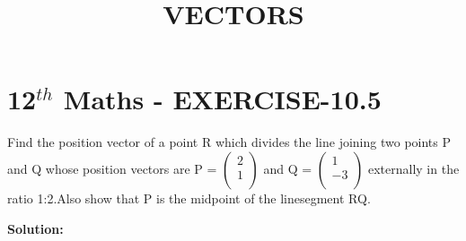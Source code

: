\documentclass[10pt]{article}
\newcommand{\solution}{\noindent \textbf{Solution: }}
\newcommand{\myvec}[1]{\ensuremath{\begin{pmatrix}#1\end{pmatrix}}}
\begin{document}
\begin{center}
\title{\textbf{VECTORS}}
\date{\vspace{-5ex}} %
\maketitle
\end{center}

\section*{12$^{th}$ Maths - EXERCISE-10.5}

Find the position vector of a point R which divides the line joining two points  P and Q whose position vectors are P = $\myvec{2\\ 1 \\}$ and Q = $\myvec{ 1\\-3\\ }$  externally in the ratio 1:2.Also show that P is the midpoint of the linesegment RQ.

\solution
\end{document}
